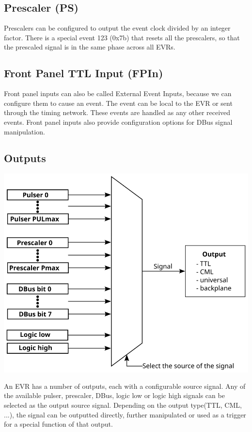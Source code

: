 \documentclass[12pt,a4paper]{article}
\begin{document}
\subsection{Prescaler (PS)}
Prescalers can be configured to output the event clock divided by an integer factor. There is a special event 123 (0x7b) that resets all the prescalers, so that the prescaled signal is in the same phase across all EVRs.

\subsection{Front Panel TTL Input (FPIn)}
Front panel inputs can also be called External Event Inputs, because we can configure them to cause an event. The event can be local to the EVR or sent through the timing network. These events are handled as any other received events. Front panel inputs also provide configuration options for DBus signal manipulation.

\subsection{Outputs}

	\includegraphics[]{./img/output}

An EVR has a number of outputs, each with a configurable source signal. Any of the available pulser, prescaler, DBus, logic low or logic high signals can be selected as the output source signal. Depending on the output type(TTL, CML, ...), the signal can be outputted directly, further manipulated or used as a trigger for a special function of that output. 
\end{document}
